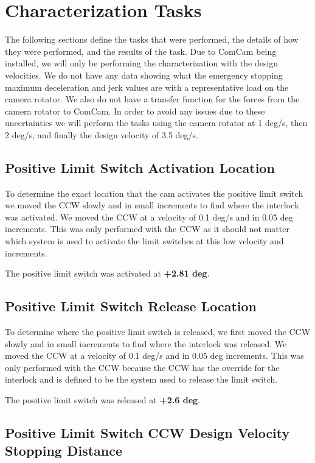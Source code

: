 \documentclass[SE,lsstdraft,authoryear,toc]{lsstdoc}
\begin{document}
\section{Characterization Tasks}\label{sec:Characterization Tasks}

The following sections define the tasks that were performed, the details of how they were performed, and the results of the task. Due to ComCam being installed, we will only be performing the characterization with the design velocities. We do not have any data showing what the emergency stopping maximum deceleration and jerk values are with a representative load on the camera rotator. We also do not have a transfer function for the forces from the camera rotator to ComCam. In order to avoid any issues due to these uncertainties we will perform the tasks using the camera rotator at 1 deg/s, then 2 deg/s, and finally the design velocity of 3.5 deg/s.

\subsection{Positive Limit Switch Activation Location}

To determine the exact location that the cam activates the positive
limit switch we moved the CCW slowly and in small increments to find
where the interlock was activated. We moved the CCW at a velocity of 0.1
deg/s and in 0.05 deg increments. This was only performed with the CCW
as it should not matter which system is used to activate the limit
switches at this low velocity and increments.

The positive limit switch was activated at \textbf{+2.81 deg}.

\subsection{Positive Limit Switch Release Location}

To determine where the positive limit switch is released, we first moved
the CCW slowly and in small increments to find where the interlock was
released. We moved the CCW at a velocity of 0.1 deg/s and in 0.05 deg
increments. This was only performed with the CCW because the CCW has the
override for the interlock and is defined to be the system used to
release the limit switch.

The positive limit switch was released at \textbf{+2.6 deg}.

\subsection{Positive Limit Switch CCW Design Velocity Stopping Distance}
\end{document}
